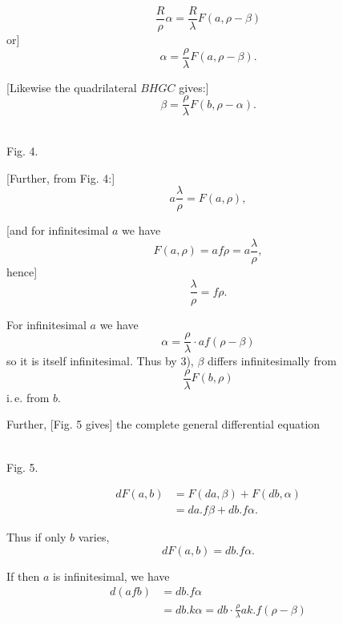 %
\[
\frac{R}{\rho}\alpha = \frac{R}{\lambda} F(a, \rho-\beta)
\]
or]
\[
\tag*{2)} \alpha = \frac{\rho}{\lambda} F(a, \rho-\beta).
\]

[Likewise the quadrilateral $BHGC$ gives:]
\[
\tag*{3)} \beta = \frac{\rho}{\lambda} F(b, \rho-\alpha).
\]

\begin{center}\begin{minipage}{\linewidth}\centering\\[3pt]Fig. 4.\end{minipage}\end{center}

[Further, from Fig. 4:]
\[
\tag*{4)} a\frac{\lambda}{\rho} = F(a, \rho),
\]

[and for infinitesimal $a$ we have
\[
F(a,\rho) = af\rho = a\frac{\lambda}{\rho},
\]
hence]
\[
\tag*{5)} \frac{\lambda}{\rho} = f\rho.
\]

For infinitesimal $a$ we have
\[
\alpha = \frac{\rho}{\lambda}\cdot af(\rho-\beta)
\]
so it is itself infinitesimal. Thus by 3), $\beta$ differs infinitesimally from
\[
\frac{\rho}{\lambda} F(b,\rho)
\]
i.\,e. from $b$.

Further, [Fig. 5 gives] the complete general differential equation

\begin{center}\begin{minipage}{\linewidth}\centering\\[3pt]Fig. 5.\end{minipage}\end{center}

\[
\tag*{6)} \begin{aligned}dF(a,b) &= F(da,\beta) + F(db,\alpha)\\ &= da.f\beta + db.f\alpha.\end{aligned}
\]

Thus if only $b$ varies,
\[
dF(a,b) = db.f\alpha.
\]

If then $a$ is infinitesimal, we have
\[
\begin{aligned}d(afb) &= db.f\alpha\\ &= db.k\alpha = db\cdot\frac{\rho}{\lambda}ak.f(\rho-\beta)\end{aligned}
\]
